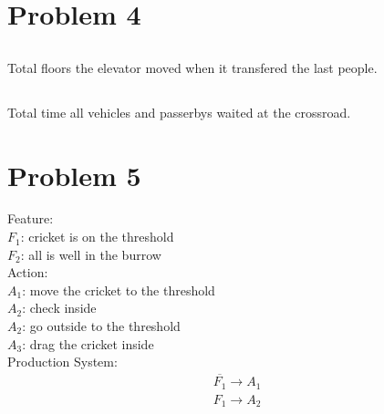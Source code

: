 \documentclass[paper=a4, fontsize=11pt]{scrartcl} %
\numberwithin{equation}{section} %
\numberwithin{figure}{section} %
\numberwithin{table}{section} %
\begin{document}


\section{Problem 4}

\subsection{}

Total floors the elevator moved when it transfered the last people.

\subsection{}

Total time all vehicles and passerbys waited at the crossroad.



\section{Problem 5}

Feature:\\
$F_1$: cricket is on the threshold\\
$F_2$: all is well in the burrow\\

Action:\\
$A_1$: move the cricket to the threshold\\
$A_2$: check inside\\
$A_2$: go outside to the threshold\\
$A_3$: drag the cricket inside\\

Production System:\\
\begin{align*}
\overline{F_1} \longrightarrow A_1\\
F_1 \longrightarrow A_2\\
\end{align*}



\end{document}
